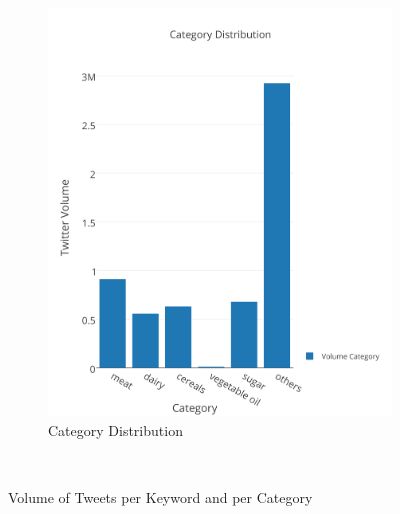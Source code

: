 \documentclass[12pt]{report}
\begin{document}
\begin{figure}
\begin{subfigure}[b]{0.5\textwidth}
                \includegraphics[width=\textwidth]{img/anal/exp_dist_cat}
                \caption{Category Distribution}
                \label{fig:cat}
        \end{subfigure}
        ~ %
      
        \caption{Volume of Tweets per Keyword and per Category}\label{fig:distribution}
\end{figure}
\end{document}
